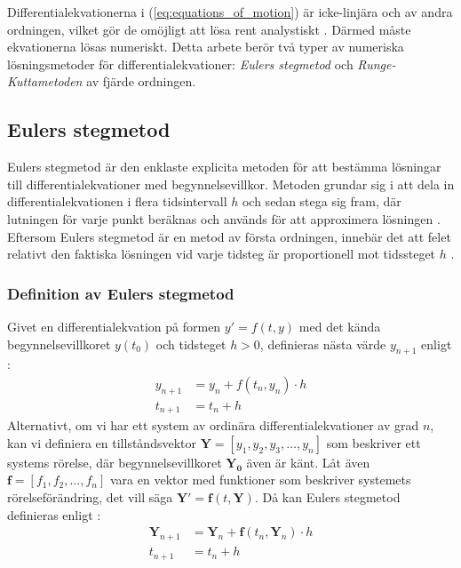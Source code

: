 Differentialekvationerna i (\ref{eq:equations_of_motion}) är icke-linjära och av andra ordningen, vilket gör de omöjligt att lösa rent analystiskt \cite{Runge-Kutta_method/Butcher2008}. Därmed måste ekvationerna lösas numeriskt. Detta arbete berör två typer av numeriska lösningsmetoder för differentialekvationer: \emph{Eulers stegmetod} och \emph{Runge-Kuttametoden} av fjärde ordningen. 

\subsection{Eulers stegmetod}

Eulers stegmetod är den enklaste explicita metoden för att bestämma lösningar till differentialekvationer med begynnelsevillkor. Metoden grundar sig i att dela in differentialekvationen i flera tidsintervall $h$ och sedan stega sig fram, där lutningen för varje punkt beräknas och används för att approximera lösningen \cite{Runge-Kutta_method/Butcher2008}. Eftersom Eulers stegmetod är en metod av första ordningen, innebär det att felet relativt den faktiska lösningen vid varje tidsteg är proportionell mot tidssteget $h$ \cite{Runge-Kutta_method/Butcher2008}. 

\subsubsection{Definition av Eulers stegmetod}

Givet en differentialekvation på formen $y' = f(t,y)$ med det kända begynnelsevillkoret $y(t_0)$ och tidsteget $h > 0$, definieras nästa värde $y_{n+1}$ enligt \cite{Runge-Kutta_method/Butcher2008}:
\begin{align}
    y_{n+1} &= y_n + f(t_n, y_n)\cdot h \\
    t_{n+1} &= t_n + h
\end{align}
Alternativt, om vi har ett system av ordinära differentialekvationer av grad $n$, kan vi definiera en tillståndsvektor $\mathbf{Y} = [y_1, y_2, y_3, \ldots, y_n]$ som beskriver ett systems rörelse, där begynnelsevillkoret $\mathbf{Y_0}$ även är känt. Låt även $\mathbf{f} = [f_1, f_2, \ldots, f_n]$ vara en vektor med funktioner som beskriver systemets rörelseförändring, det vill säga $\mathbf{Y}' = \mathbf{f}(t,\mathbf{Y})$. Då kan Eulers stegmetod definieras enligt \cite{Runge-Kutta_method/Butcher2008}:
\begin{align}
    \mathbf{Y}_{n+1} &= \mathbf{Y}_n + \mathbf{f}(t_n, \mathbf{Y}_n) \cdot h \\
    t_{n+1} &= t_n + h
\end{align}


